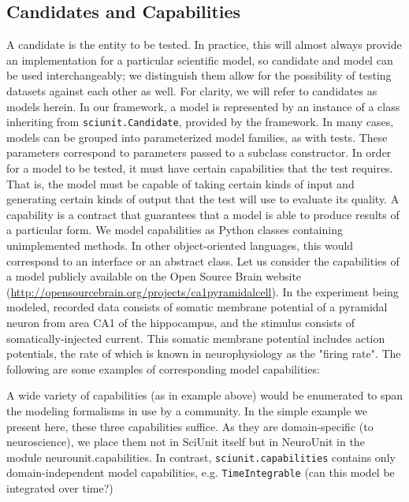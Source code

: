 \documentclass[11pt,letterpaper]{article}
\begin{document}
\subsection{Candidates and Capabilities}
A candidate is the entity to be tested.  In practice, this will almost always provide an implementation for a particular scientific model, so candidate and model can be used interchangeably; we distinguish them allow for the possibility of testing datasets against each other as well.  For clarity, we will refer to candidates as models herein.  In our framework, a model is represented by an instance of a class inheriting from \verb|sciunit.Candidate|, provided by the framework.  In many cases, models can be grouped into parameterized model families, as with tests. These parameters correspond to parameters passed to a subclass constructor.
In order for a model to be tested, it must have certain capabilities that the test requires.  That is, the model must be capable of taking certain kinds of input and generating certain kinds of output that the test will use to evaluate its quality.  A capability is a contract that guarantees that a model is able to produce results of a particular form. We model capabilities as Python classes containing unimplemented methods. In other object-oriented languages, this would correspond to an interface or an abstract class.  
Let us consider the capabilities of a model publicly available on the Open Source Brain website (\url{http://opensourcebrain.org/projects/ca1pyramidalcell}).  In the experiment being modeled, recorded data consists of somatic membrane potential of a pyramidal neuron from area CA1 of the hippocampus, and the stimulus consists of somatically-injected current.  This somatic membrane potential includes action potentials, the rate of which is known in neurophysiology as the "firing rate".  The following are some examples of corresponding model capabilities:  

A wide variety of capabilities (as in example above) would be enumerated to span the modeling formalisms in use by a community. In the simple example we present here, these three capabilities suffice.  As they are domain-specific (to neuroscience), we place them not in SciUnit itself but in NeuroUnit in the module neurounit.capabilities.  In contrast, \verb|sciunit.capabilities| contains only domain-independent model capabilities, e.g. \verb|TimeIntegrable| (can this model be integrated over time?)
\end{document}

